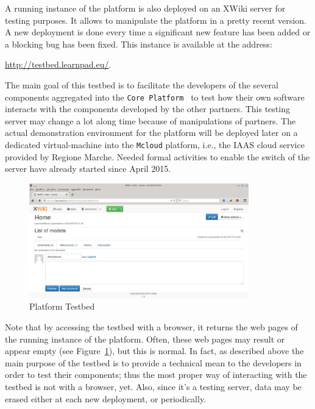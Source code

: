 \documentclass{learnpad}
\begin{document}
A running instance of the \learnpad platform is also deployed on an XWiki 
server for testing purposes. It allows to manipulate the platform in a pretty 
recent version.  A new deployment is done every time a significant new feature 
has been added or a blocking bug has been fixed. This instance is available 
at the address:

\url{http://testbed.learnpad.eu/}.

The main goal of this testbed is to facilitate the developers of the several 
components aggregated into the \texttt{\learnpad Core 
Platform}~\cite{learnpad:D2.1} to test how their own software interacts with 
the components developed by the other partners. This testing server may change a 
lot along time because of manipulations of partners. The actual demonstration environment
for the \learnpad platform will be deployed later on a dedicated virtual-machine
into the \texttt{Mcloud} platform, i.e., the IAAS cloud service
provided by Regione Marche. Needed formal activities to enable the
switch of the server have already started since April 2015.


\begin{figure}[h!]
 \centering
 \includegraphics[width=0.85\textwidth]{./Figures/testbed.jpg}
 \caption{\learnpad Platform Testbed}
 \label{fig:testbed}
\end{figure}

Note that by accessing the testbed with a browser, it returns the 
web pages of the running instance of the platform. Often, these web pages may 
result or appear empty (see Figure~\ref{fig:testbed}), but this is normal.
In fact, as described above the main purpose of the testbed is to provide
a technical mean to the developers in order to test their components; thus the 
most proper way of interacting with the testbed is not with a browser, yet.
Also, since it's a testing server, data may be erased either at each new
deployment, or periodically.
\end{document}
